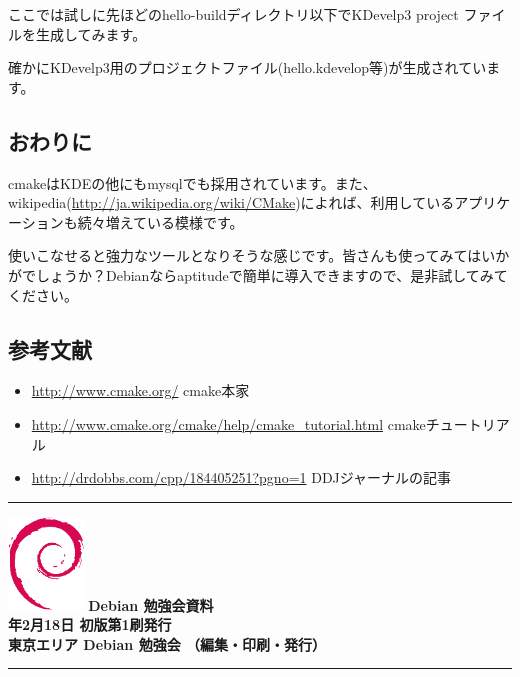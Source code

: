 \documentclass[mingoth,a4paper]{jsarticle}
\newcommand{\debmtgyear}{2012}
\newcommand{\debmtgmonth}{2}
\newcommand{\debmtgdate}{18}
\begin{document}
ここでは試しに先ほどのhello-buildディレクトリ以下でKDevelp3 project ファイルを生成してみます。

確かにKDevelp3用のプロジェクトファイル(hello.kdevelop等)が生成されています。

\subsection{おわりに}

cmakeはKDEの他にもmysqlでも採用されています。また、wikipedia(\url{http://ja.wikipedia.org/wiki/CMake})によれば、利用しているアプリケーションも続々増えている模様です。

使いこなせると強力なツールとなりそうな感じです。皆さんも使ってみてはいかがでしょうか？Debianならaptitudeで簡単に導入できますので、是非試してみてください。

\subsection{参考文献}

\begin{itemize}
\item \url{http://www.cmake.org/} cmake本家
\item \url{http://www.cmake.org/cmake/help/cmake_tutorial.html} cmakeチュートリアル
\item \url{http://drdobbs.com/cpp/184405251?pgno=1} DDJジャーナルの記事
\end{itemize}

\printindex

\cleartooddpage

\vspace*{15cm}
\hrule
\vspace{2mm}
\includegraphics[width=2cm]{image200502/openlogo-nd.eps}
\noindent \Large \bf Debian 勉強会資料\\
\noindent \normalfont \debmtgyear{}年\debmtgmonth{}月\debmtgdate{}日 \hspace{5mm}  初版第1刷発行\\
\noindent \normalfont 東京エリア Debian 勉強会 （編集・印刷・発行）\\
\hrule
\end{document}
